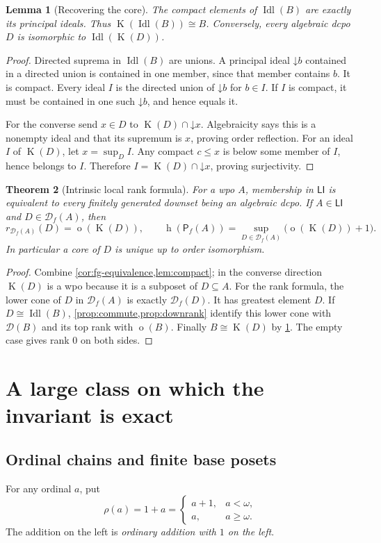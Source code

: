 \documentclass[11pt,letterpaper]{article}
\theoremstyle{teal}
\newtheorem{theorem}{Theorem}[section]
\newtheorem{lemma}[theorem]{Lemma}
\theoremstyle{definition}
\newcommand{\Pf}{\mathsf P_{\!f}}
\newcommand{\Df}{\mathcal D_{\!f}}
\newcommand{\Down}{\mathcal D}
\newcommand{\Idl}{\operatorname{Idl}}
\newcommand{\Comp}{\operatorname{K}}
\newcommand{\hgt}{\operatorname{h}}
\newcommand{\mot}{\operatorname{o}}
\newcommand{\LI}{\mathsf{LI}}
\newcommand{\dn}{\mathord\downarrow}
\begin{document}
\begin{lemma}[Recovering the core]\label{lem:compact}
The compact elements of $\Idl(B)$ are exactly its principal ideals. Thus $\Comp(\Idl(B))\cong B$. Conversely, every algebraic dcpo $D$ is isomorphic to $\Idl(\Comp(D))$.
\end{lemma}
\begin{proof}
Directed suprema in $\Idl(B)$ are unions. A principal ideal $\dn b$ contained in a directed union is contained in one member, since that member contains $b$. It is compact. Every ideal $I$ is the directed union of $\dn b$ for $b\in I$. If $I$ is compact, it must be contained in one such $\dn b$, and hence equals it.

For the converse send $x\in D$ to $\Comp(D)\cap\dn x$. Algebraicity says this is a nonempty ideal and that its supremum is $x$, proving order reflection. For an ideal $I$ of $\Comp(D)$, let $x=\sup_D I$. Any compact $c\leq x$ is below some member of $I$, hence belongs to $I$. Therefore $I=\Comp(D)\cap\dn x$, proving surjectivity.
\end{proof}

\begin{theorem}[Intrinsic local rank formula]\label{thm:pointwise}
For a wpo $A$, membership in $\LI$ is equivalent to every finitely generated downset being an algebraic dcpo. If $A\in\LI$ and $D\in\Df(A)$, then
\begin{equation}\label{eq:pointwise}
 r_{\Df(A)}(D)=\mot(\Comp(D)),
 \qquad
 \hgt(\Pf(A))=\sup_{D\in\Df(A)}\bigl(\mot(\Comp(D))+1\bigr).
\end{equation}
In particular a core of $D$ is unique up to order isomorphism.
\end{theorem}
\begin{proof}
Combine \cref{cor:fg-equivalence,lem:compact}; in the converse direction $\Comp(D)$ is a wpo because it is a subposet of $D\subseteq A$. For the rank formula, the lower cone of $D$ in $\Df(A)$ is exactly $\Df(D)$. It has greatest element $D$. If $D\cong\Idl(B)$, \cref{prop:commute,prop:downrank} identify this lower cone with $\Down(B)$ and its top rank with $\mot(B)$. Finally $B\cong\Comp(D)$ by \cref{lem:compact}. The empty case gives rank $0$ on both sides.
\end{proof}

\section{A large class on which the invariant is exact}
\subsection{Ordinal chains and finite base posets}
For any ordinal $a$, put
\begin{equation}\label{eq:rho}
 \rho(a)=1+a=
 \begin{cases}a+1,&a<\omega,\\a,&a\geq\omega.
 \end{cases}
\end{equation}
The addition on the left is \emph{ordinary addition with $1$ on the left}.
\end{document}
